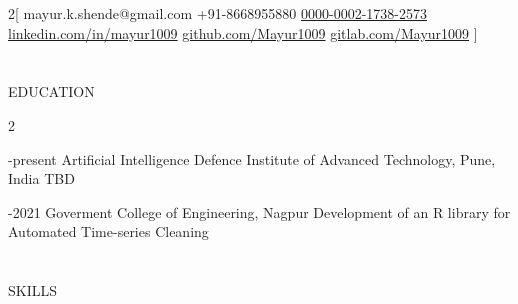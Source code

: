 \documentclass{my_cv}
\begin{document}
\begin{multicols}{2}[
        {}%
        {}%
        {mayur.k.shende@gmail.com}%
        {+91-8668955880}%
        {\href{https://orcid.org/0000-0002-1738-2573}{0000-0002-1738-2573}}%
        {\url{linkedin.com/in/mayur1009}}%
        {\url{github.com/Mayur1009}}%
    	{\url{gitlab.com/Mayur1009}}%
]
\end{multicols}



\section{\faGraduationCap}{EDUCATION}

\begin{multicols}{2}

{\faCalendar {}-present}%
{Artificial Intelligence}%
{Defence Institute of Advanced Technology, Pune, India} %
{TBD}

\columnbreak

{\faCalendar {}-2021}%
{}%
{Goverment College of Engineering, Nagpur} %
{Development of an R library for Automated Time-series Cleaning}

\end{multicols}





\section{\faList}{SKILLS}
\end{document}

